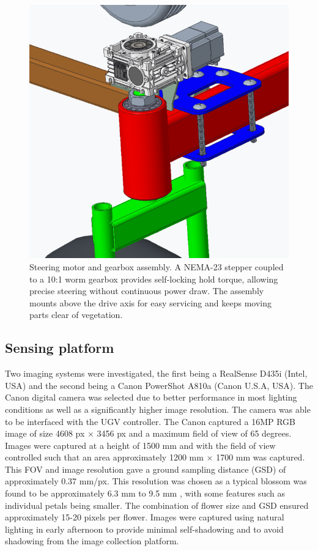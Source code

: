 \begin{figure}
    \centering
    \includegraphics[width=0.75\linewidth]{images/secondary steering.png}
    \caption{Steering motor and gearbox assembly. A NEMA-23 stepper coupled to a 10:1 worm gearbox provides self-locking hold torque, allowing precise steering without continuous power draw. The assembly mounts above the drive axis for easy servicing and keeps moving parts clear of vegetation.}

    \label{fig:steer}
\end{figure}

\subsection{Sensing platform}

Two imaging systems were investigated, the first being a RealSense D435i (Intel, USA) and the second being a Canon PowerShot A810a (Canon U.S.A, USA). The Canon digital camera was selected due to better performance in most lighting conditions as well as a significantly higher image resolution. The camera was able to be interfaced with the UGV controller. The Canon captured a 16MP RGB image of size 4608 px $\times$ 3456 px and a maximum field of view of 65 degrees.  Images were captured at a height of 1500 mm and with the field of view controlled such that an area approximately 1200 mm $\times$ 1700 mm was captured. This FOV and image resolution gave a ground sampling distance (GSD) of approximately 0.37 mm/px. This resolution was chosen as a typical blossom was found to be approximately 6.3 mm to 9.5 mm \cite{diaz-garcia_image-based_2018}, with some features such as individual petals being smaller. The combination of flower size and GSD ensured approximately 15-20 pixels per flower. Images were captured using natural lighting in early afternoon to provide minimal self-shadowing and to avoid shadowing from the image collection platform.


